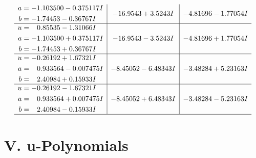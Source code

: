 \documentclass[1p]{elsarticle_modified}
\theoremstyle{definition}
\begin{document}
$$\begin{array}{c|c|c}
\begin{aligned}
a &= -1.103500 - 0.375117 I \\
b &= -1.74453 - 0.36767 I\end{aligned}
 & -16.9543 + 3.5243 I & -4.81696 - 1.77054 I \\ \hline\begin{aligned}
u &= \phantom{-}0.85535 - 1.31066 I \\
a &= -1.103500 + 0.375117 I \\
b &= -1.74453 + 0.36767 I\end{aligned}
 & -16.9543 - 3.5243 I & -4.81696 + 1.77054 I \\ \hline\begin{aligned}
u &= -0.26192 + 1.67321 I \\
a &= \phantom{-}0.933564 - 0.007475 I \\
b &= \phantom{-}2.40984 + 0.15933 I\end{aligned}
 & -8.45052 - 6.48343 I & -3.48284 + 5.23163 I \\ \hline\begin{aligned}
u &= -0.26192 - 1.67321 I \\
a &= \phantom{-}0.933564 + 0.007475 I \\
b &= \phantom{-}2.40984 - 0.15933 I\end{aligned}
 & -8.45052 + 6.48343 I & -3.48284 - 5.23163 I\\
 \hline 
 \end{array}$$\newpage
\newpage\renewcommand{\arraystretch}{1}
\centering \section*{ V. u-Polynomials}
\end{document}
